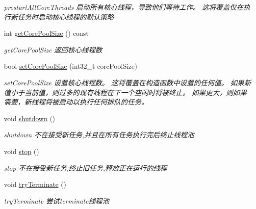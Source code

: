 \begin{DoxyCompactItemize}
\begin{DoxyCompactList}\small\item\em prestart\+All\+Core\+Threads 启动所有核心线程，导致他们等待工作。 这将覆盖仅在执行新任务时启动核心线程的默认策略 \end{DoxyCompactList}\item 
int \hyperlink{classThreadPoolExecutor_a9099318ba5cab5dd05f219babba4b6b7}{get\+Core\+Pool\+Size} () const
\begin{DoxyCompactList}\small\item\em get\+Core\+Pool\+Size 返回核心线程数 \end{DoxyCompactList}\item 
bool \hyperlink{classThreadPoolExecutor_aaada9deadf7c0f72bca5076deaa8c92f}{set\+Core\+Pool\+Size} (int32\+\_\+t core\+Pool\+Size)
\begin{DoxyCompactList}\small\item\em set\+Core\+Pool\+Size 设置核心线程数。 这将覆盖在构造函数中设置的任何值。 如果新值小于当前值，则过多的现有线程在下一个空闲时将被终止。 如果更大，则如果需要，新线程将被启动以执行任何排队的任务。 \end{DoxyCompactList}\item 
\mbox{\label{classThreadPoolExecutor_ad04796913a932a6e465696d7b2656e86}} 
void \hyperlink{classThreadPoolExecutor_ad04796913a932a6e465696d7b2656e86}{shutdown} ()
\begin{DoxyCompactList}\small\item\em shutdown 不在接受新任务,并且在所有任务执行完后终止线程池 \end{DoxyCompactList}\item 
\mbox{\label{classThreadPoolExecutor_acddd3730721069eca335e1529926f9d9}} 
void \hyperlink{classThreadPoolExecutor_acddd3730721069eca335e1529926f9d9}{stop} ()
\begin{DoxyCompactList}\small\item\em stop 不在接受新任务,终止旧任务,释放正在运行的线程 \end{DoxyCompactList}\item 
\mbox{\label{classThreadPoolExecutor_aaf794e9f8f8537f221ddff130129fee6}} 
void \hyperlink{classThreadPoolExecutor_aaf794e9f8f8537f221ddff130129fee6}{try\+Terminate} ()
\begin{DoxyCompactList}\small\item\em try\+Terminate 尝试terminate线程池 \end{DoxyCompactList}\item 

\end{DoxyCompactItemize}
